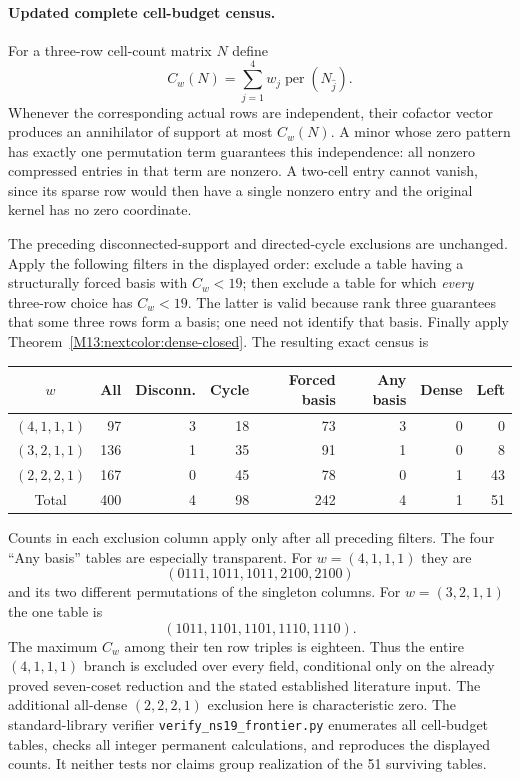 \documentclass[11pt,a4paper,oneside]{report}
\theoremstyle{definition}
\theoremstyle{remark}
\begin{document}
\paragraph{Updated complete cell-budget census.}
For a three-row cell-count matrix $N$ define
\[
 C_w(N)=\sum_{j=1}^4w_j\operatorname{per}(N_{\widehat j}).
\]
Whenever the corresponding actual rows are independent, their
cofactor vector produces an annihilator of support at most
$C_w(N)$. A minor whose zero pattern has exactly one permutation
term guarantees this independence: all nonzero compressed
entries in that term are nonzero. A two-cell entry cannot vanish,
since its sparse row would then have a single nonzero entry and
the original kernel has no zero coordinate.

The preceding disconnected-support and directed-cycle exclusions
are unchanged. Apply the following filters in the displayed order:
exclude a table having a structurally forced basis with $C_w<19$;
then exclude a table for which \emph{every} three-row choice has
$C_w<19$. The latter is valid because rank three guarantees that
some three rows form a basis; one need not identify that basis.
Finally apply Theorem~\ref{M13:nextcolor:dense-closed}.
The resulting exact census is
\begin{center}
\begin{tabular}{@{}crrrrrrr@{}}
\toprule
$w$ & All & Disconn. & Cycle & Forced basis & Any basis & Dense & Left\\
\midrule
$(4,1,1,1)$&97&3&18&73&3&0&0\\
$(3,2,1,1)$&136&1&35&91&1&0&8\\
$(2,2,2,1)$&167&0&45&78&0&1&43\\
\midrule
Total&400&4&98&242&4&1&51\\
\bottomrule
\end{tabular}
\end{center}
Counts in each exclusion column apply only after all preceding
filters. The four ``Any basis'' tables are especially transparent.
For $w=(4,1,1,1)$ they are
\[
 (0111,1011,1011,2100,2100)
\]
and its two different permutations of the singleton columns.
For $w=(3,2,1,1)$ the one table is
\[
 (1011,1101,1101,1110,1110).
\]
The maximum $C_w$ among their ten row triples is eighteen.
Thus the entire $(4,1,1,1)$ branch is excluded over every field,
conditional only on the already proved seven-coset reduction
and the stated established literature input. The additional
all-dense $(2,2,2,1)$ exclusion here is characteristic zero.
The standard-library verifier \texttt{verify\_ns19\_frontier.py}
enumerates all cell-budget tables, checks all integer permanent
calculations, and reproduces the displayed counts. It neither
tests nor claims group realization of the 51 surviving tables.
\end{document}
